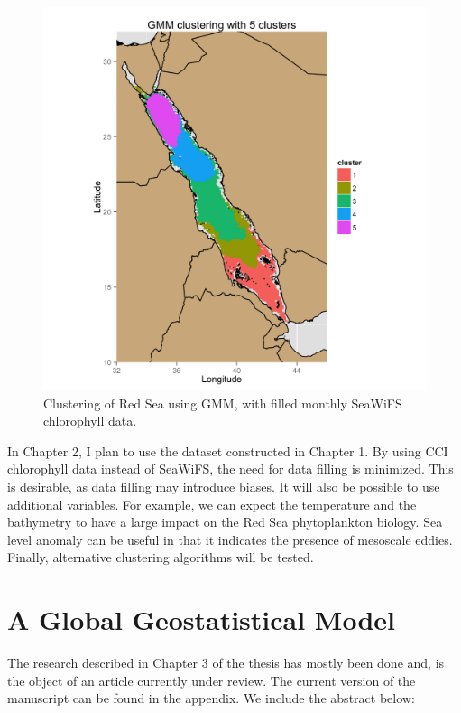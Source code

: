 \begin{figure}[h]
    \centering
    \includegraphics[scale=.15]{figures/clusters_k5.png}
    \caption{Clustering of Red Sea using GMM, with filled monthly SeaWiFS
             chlorophyll data.}
    \label{cluster}
\end{figure}

In Chapter 2, I plan to use the dataset constructed in Chapter 1.  By using CCI
chlorophyll data instead of SeaWiFS, the need for data filling is minimized.
This is desirable, as data filling may introduce biases. It will also be
possible to use additional variables. For example, we can expect the
temperature and the bathymetry to have a large impact on the Red Sea
phytoplankton biology. Sea level anomaly can be useful in that it indicates the
presence of mesoscale eddies. Finally, alternative clustering algorithms will
be tested.

\section{A Global Geostatistical Model}

The research described in Chapter 3 of the thesis has mostly been
done and, is the object of an article currently under review. The current version
of the manuscript can be found in the appendix. We include the abstract below:

